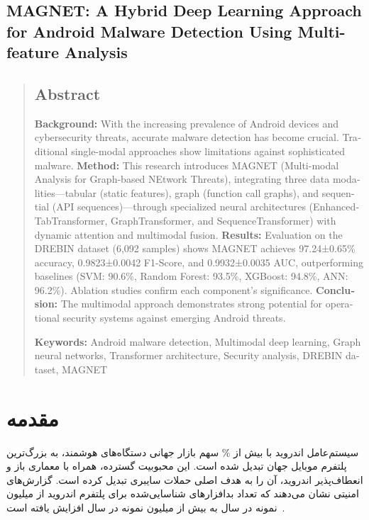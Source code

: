 \documentclass[a4paper,11pt]{article}
\begin{document}
\newpage

\begin{latin}
  \section*{MAGNET: A Hybrid Deep Learning Approach for Android Malware Detection Using Multi-feature Analysis}
  \begin{abstract}
    \section*{Abstract}
    \normalsize
    \textbf{Background:} With the increasing prevalence of Android devices and cybersecurity threats, accurate malware detection has become crucial. Traditional single-modal approaches show limitations against sophisticated malware. \textbf{Method:} This research introduces MAGNET (Multi-modal Analysis for Graph-based NEtwork Threats), integrating three data modalities—tabular (static features), graph (function call graphs), and sequential (API sequences)—through specialized neural architectures (EnhancedTabTransformer, GraphTransformer, and SequenceTransformer) with dynamic attention and multimodal fusion. \textbf{Results:} Evaluation on the DREBIN dataset (6,092 samples) shows MAGNET achieves 97.24±0.65\% accuracy, 0.9823±0.0042 F1-Score, and 0.9932±0.0035 AUC, outperforming baselines (SVM: 90.6\%, Random Forest: 93.5\%, XGBoost: 94.8\%, ANN: 96.2\%). Ablation studies confirm each component’s significance. \textbf{Conclusion:} The multimodal approach demonstrates strong potential for operational security systems against emerging Android threats.

    \textbf{Keywords:} Android malware detection, Multimodal deep learning, Graph neural networks, Transformer architecture, Security analysis, DREBIN dataset, MAGNET
  \end{abstract}
\end{latin}

\newpage
\twocolumn

\section{مقدمه}
سیستم‌عامل اندروید با بیش از \% سهم بازار جهانی دستگاه‌های هوشمند، به بزرگ‌ترین پلتفرم موبایل جهان تبدیل شده است. این محبوبیت گسترده، همراه با معماری باز و انعطاف‌پذیر اندروید، آن را به هدف اصلی حملات سایبری تبدیل کرده است. گزارش‌های امنیتی نشان می‌دهند که تعداد بدافزارهای شناسایی‌شده برای پلتفرم اندروید از  میلیون نمونه در سال  به بیش از  میلیون نمونه در سال  افزایش یافته است~\cite{AVTestReport2023}.
\end{document}
